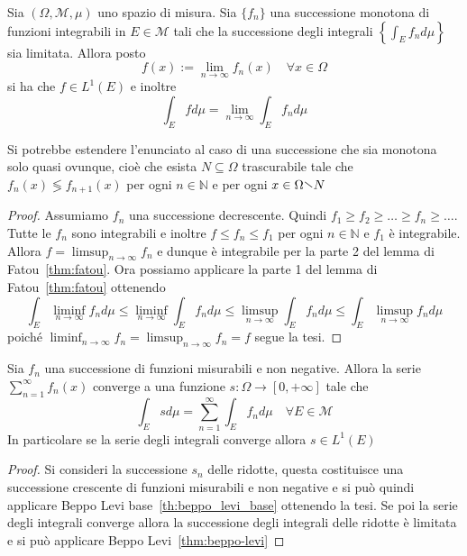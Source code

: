 \begin{theorem}\label{thm:beppo-levi}
    Sia \({(\Omega, \mathcal{M}, \mu)}\) uno spazio di misura. Sia \(\{f_{n}\}
    \) una successione monotona di funzioni integrabili in \(E \in \mathcal{M}\)  tali che la successione
    degli integrali \(\displaystyle \left\{\int_E f_{n} d\mu\right\} \) sia limitata.
    Allora posto
    \[
        f{(x)} := \lim_{n \to \infty} f_{n}{(x)} \quad \forall x \in \Omega
    \]
    si ha che \(f \in L^{1}{(E)}\) e inoltre
    \[
        \int_E f d\mu = \lim_{n \to \infty} \int_E f_{n} d\mu 
    \]
\end{theorem}
\begin{remark}
    Si potrebbe estendere l'enunciato al caso di una successione che sia
    monotona solo quasi ovunque, cioè che esista \(N \subseteq \Omega \) trascurabile
    tale che \(f_{n}{(x)} \lessgtr f_{n+1}{(x)} \) per ogni \(n \in \mathbb{N}\)
    e per ogni \(x \in \Omega \sminus N\)
\end{remark}
\begin{proof}
    Assumiamo \(f_{n}\) una successione decrescente. Quindi \(f_{1} \ge f_{2}
    \ge \dots\ge f_{n}\ge \dots\). 
    Tutte le \(f_{n}\) sono integrabili e inoltre \(f \le f_{n} \le f_{1}\) per ogni
    \(n \in \mathbb{N}\) e \(f_{1}\) è integrabile.
    Allora \(f = \limsup_{n \to \infty} f_{n}\) e dunque è integrabile per la
    parte 2 del lemma di Fatou~\ref{thm:fatou}.
    Ora possiamo applicare la parte 1 del lemma di Fatou~\ref{thm:fatou} ottenendo
    \[
        \int_E \liminf_{n \to \infty} f_{n} d\mu \le \liminf_{n
        \to \infty} \int_E f_{n} d\mu \le \limsup_{n \to \infty} \int_E f_{n}
        d\mu \le  \int_E \limsup_{n \to \infty} f_{n} d\mu
    \]
    poiché \(\displaystyle \liminf_{n \to \infty} f_{n} = \limsup_{n \to \infty}
    f_{n} = f\) segue la tesi.
\end{proof}
\begin{corollary}\label{cor:beppo-levi-serie}
    Sia \(f_{n}\) una successione di funzioni misurabili e non negative. Allora
    la serie \(\sum_{n=1}^{\infty} f_{n}{(x)} \) converge a una funzione \(s:
    \Omega \to [0, +\infty]\) tale che
    \[
        \int_E s d\mu = \sum_{n=1}^{\infty} \int_E f_{n} d\mu \quad \forall E
        \in \mathcal{M} 
    \]
    In particolare se la serie degli integrali converge allora \(s \in L^{1}{(E)}\) 
\end{corollary}
\begin{proof}
    Si consideri la successione \(s_{n}\) delle ridotte, questa costituisce una
    successione crescente di funzioni misurabili e non negative e si può quindi
    applicare Beppo Levi base~\ref{th:beppo_levi_base} ottenendo la tesi. Se poi
    la serie degli integrali converge allora la successione degli integrali
    delle ridotte è limitata e si può applicare Beppo Levi~\ref{thm:beppo-levi}
\end{proof}

